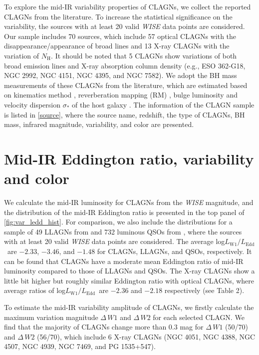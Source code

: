 \documentclass[linenumbers]{aastex631}
\begin{document}
To explore the mid-IR variability properties of CLAGNs, we collect the reported CLAGNs from the literature. To increase the statistical significance on the variability, the sources with at least 20 valid \textit{WISE} data points are considered. Our sample includes 70 sources, which include 57 optical CLAGNs with the disappearance/appearance of broad lines and 13 X-ray CLAGNs with the variation of $N_\mathrm{H}$. It should be noted that 5 CLAGNs show variations of both broad emission lines and X-ray absorption column density (e.g., ESO 362-G18, NGC 2992, NGC 4151, NGC 4395, and NGC 7582). We adopt the BH mass measurements of these CLAGNs from the literature, which are estimated based on kinematics method \citep[e.g.,][]{2003MNRAS.345.1057M}, reverberation mapping (RM) \citep[e.g.,][]{2011MNRAS.410.1877S,2017ApJ...840...97F}, bulge luminosity \citep[$L_\mathrm{bulge}$, e.g.,][]{2006AJ....131.1236D} and velocity dispersion $\sigma_{*}$ of the host galaxy \citep{2002ApJ...574..740T}. The information of the CLAGN sample is listed in \autoref{source}, where the source name, redshift, the type of CLAGNs, BH mass, infrared magnitude, variability, and color are presented.




\section{Mid-IR Eddington ratio, variability and color}\label{sec:mir_var_col_lum}
We calculate the mid-IR luminosity for CLAGNs from the \textit{WISE} magnitude, and the distribution of the mid-IR Eddington ratio is presented in the top panel of \autoref{fig:var_ledd_hist}. For comparison, we also include the distributions for a sample of 49 LLAGNs from \citet{2009MNRAS.399..349G} and 732 luminous QSOs from \citet{2007ApJ...667..131G}, where the sources with at least 20 valid \textit{WISE} data points are considered. The average log$L_\mathrm{W1}/L_\mathrm{Edd}$\, are $-2.33$, $-3.46$, and $-1.48$ for CLAGNs, LLAGNs, and QSOs, respectively. It can be found that CLAGNs have a moderate mean Eddington ratio of mid-IR luminosity compared to those of LLAGNs and QSOs. The X-ray CLAGNs show a little bit higher but roughly similar Eddington ratio with optical CLAGNs, where average ratios of log$L_\mathrm{W1}/L_\mathrm{Edd}$\ are $-2.36$ and $-2.18$ respectively (see Table 2).     
 

To estimate the mid-IR variability amplitude of CLAGNs, we firstly calculate the maximum variation magnitude $\Delta\,W1$ and $\Delta\,W2$ for each selected CLAGN. We find that the majority of CLAGNs change more than $0.3$ mag for $\Delta\,W1$ (50/70) and $\Delta\,W2$ (56/70), which include 6 X-ray CLAGNs (NGC 4051, NGC 4388, NGC 4507, NGC 4939, NGC 7469, and PG 1535+547). 
\end{document}
